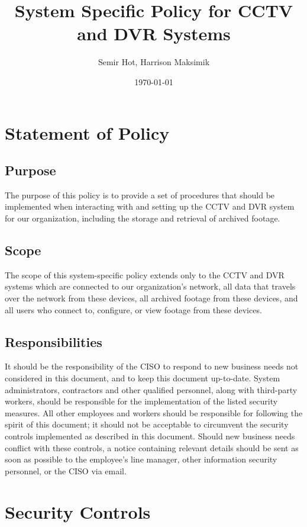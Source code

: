 \documentclass[11pt]{article}
\author{Semir Hot, Harrison Maksimik}
\date{\today}
\title{System Specific Policy for CCTV and DVR Systems}
\begin{document}
\maketitle
\tableofcontents

\section{Statement of Policy}
\label{sec:org997792e}
\subsection{Purpose}
\label{sec:org1a31998}
The purpose of this policy is to provide a set of procedures that should be implemented when interacting with and setting up the CCTV and DVR system for our organization, including the storage and retrieval of archived footage.

\subsection{Scope}
\label{sec:orgd759633}
The scope of this system-specific policy extends only to the CCTV and DVR systems which are connected to our organization's network, all data that travels over the network from these devices, all archived footage from these devices, and all users who connect to, configure, or view footage from these devices.

\subsection{Responsibilities}
\label{sec:org3b196f2}
It should be the responsibility of the CISO to respond to new business needs not considered in this document, and to keep this document up-to-date. System administrators, contractors and other qualified personnel, along with third-party workers, should be responsible for the implementation of the listed security measures. All other employees and workers should be responsible for following the spirit of this document; it should not be acceptable to circumvent the security controls implemented as described in this document. Should new business needs conflict with these controls, a notice containing relevant details should be sent as soon as possible to the employee's line manager, other information security personnel, or the CISO via email.

\section{Security Controls}
\label{sec:org188fd39}
\end{document}
